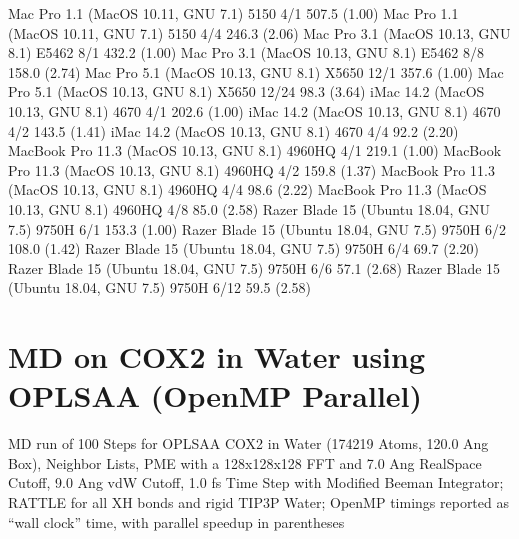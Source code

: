 \documentclass[letterpaper,11pt,english]{sphinxmanual}
\begin{document}

\begin{sphinxVerbatim}[commandchars=\\\{\}]
Mac Pro 1.1 (MacOS 10.11, GNU 7.1)             5150           4/1       507.5 (1.00)
Mac Pro 1.1 (MacOS 10.11, GNU 7.1)             5150           4/4       246.3 (2.06)
Mac Pro 3.1 (MacOS 10.13, GNU 8.1)            E5462           8/1       432.2 (1.00)
Mac Pro 3.1 (MacOS 10.13, GNU 8.1)            E5462           8/8       158.0 (2.74)
Mac Pro 5.1 (MacOS 10.13, GNU 8.1)            X5650          12/1       357.6 (1.00)
Mac Pro 5.1 (MacOS 10.13, GNU 8.1)            X5650         12/24        98.3 (3.64)
iMac 14.2 (MacOS 10.13, GNU 8.1)               4670           4/1       202.6 (1.00)
iMac 14.2 (MacOS 10.13, GNU 8.1)               4670           4/2       143.5 (1.41)
iMac 14.2 (MacOS 10.13, GNU 8.1)               4670           4/4        92.2 (2.20)
MacBook Pro 11.3 (MacOS 10.13, GNU 8.1)      4960HQ           4/1       219.1 (1.00)
MacBook Pro 11.3 (MacOS 10.13, GNU 8.1)      4960HQ           4/2       159.8 (1.37)
MacBook Pro 11.3 (MacOS 10.13, GNU 8.1)      4960HQ           4/4        98.6 (2.22)
MacBook Pro 11.3 (MacOS 10.13, GNU 8.1)      4960HQ           4/8        85.0 (2.58)
Razer Blade 15 (Ubuntu 18.04, GNU 7.5)        9750H           6/1       153.3 (1.00)
Razer Blade 15 (Ubuntu 18.04, GNU 7.5)        9750H           6/2       108.0 (1.42)
Razer Blade 15 (Ubuntu 18.04, GNU 7.5)        9750H           6/4        69.7 (2.20)
Razer Blade 15 (Ubuntu 18.04, GNU 7.5)        9750H           6/6        57.1 (2.68)
Razer Blade 15 (Ubuntu 18.04, GNU 7.5)        9750H          6/12        59.5 (2.58)
\end{sphinxVerbatim}


\section{MD on COX\sphinxhyphen{}2 in Water using OPLS\sphinxhyphen{}AA (OpenMP Parallel)}
\label{\detokenize{text/benchmarks:md-on-cox-2-in-water-using-opls-aa-openmp-parallel}}
MD run of 100 Steps for OPLS\sphinxhyphen{}AA COX\sphinxhyphen{}2 in Water (174219 Atoms, 120.0 Ang Box), Neighbor Lists, PME with a 128x128x128 FFT and 7.0 Ang Real\sphinxhyphen{}Space Cutoff, 9.0 Ang vdW Cutoff, 1.0 fs Time Step with Modified Beeman Integrator; RATTLE for all X\sphinxhyphen{}H bonds and rigid TIP3P Water; OpenMP timings reported as “wall clock” time, with parallel speedup in parentheses
\end{document}
